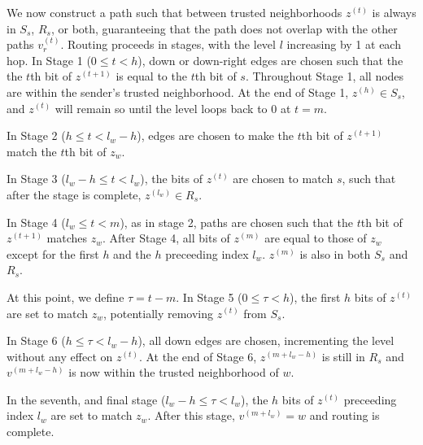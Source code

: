 \documentclass[twocolumn]{article}
\begin{document}
We now construct a path such that between trusted neighborhoods $z^{(t)}$ is always
in $S_s$, $R_s$, or both, guaranteeing that the path does not overlap with the
other paths $v_r^{(t)}$.
Routing proceeds in stages, with the level $l$ increasing by 1 at each hop.
In Stage 1 ($0 \leq t < h$), down or down-right edges
are chosen such that the the $t$th bit of $z^{(t+1)}$ is equal to the $t$th bit
of $s$. Throughout Stage 1, all nodes are within the sender's trusted neighborhood.
At the end of Stage 1, $z^{(h)} \in S_s$, and $z^{(t)}$ will remain so until the level loops
back to $0$ at $t = m$.

In Stage 2 ($h \leq t < l_w - h$), edges are chosen to make the $t$th bit of
$z^{(t+1)}$ match the $t$th bit of $z_w$.

In Stage 3 ($l_w - h \leq t < l_w$), the bits of $z^{(t)}$ are chosen to match $s$,
such that after the stage is complete, $z^{(l_w)} \in R_s$.

In Stage 4 ($l_w \leq t < m$), as in stage 2,
paths are chosen such that the $t$th bit of $z^{(t+1)}$ matches $z_w$.
After Stage 4, all bits of $z^{(m)}$ are equal to those of $z_w$
except for the first $h$ and the $h$ preceeding index $l_w$.
$z^{(m)}$ is also in both $S_s$ and $R_s$.

At this point, we define $\tau = t - m$.
In Stage 5 ($0 \leq \tau < h$), the first $h$ bits of $z^{(t)}$ are set to
match $z_w$, potentially removing $z^{(t)}$ from $S_s$.

In Stage 6 ($h \leq \tau < l_w - h$), all down edges are chosen, incrementing
the level without any effect on $z^{(t)}$.
At the end of Stage 6, $z^{(m + l_w - h)}$ is still in $R_s$ and
$v^{(m + l_w - h)}$ is now within the trusted neighborhood of $w$.

In the seventh, and final stage ($l_w - h \leq \tau < l_w$), the $h$ bits of $z^{(t)}$
preceeding index $l_w$ are set to match $z_w$.
After this stage, $v^{(m + l_w)} = w$ and routing is complete.
\end{document}
